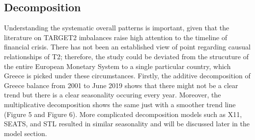 \documentclass[12pt]{article}
\begin{document}
\subsection{Decomposition}
Understanding the systematic overall patterns is important, given that the literature on TARGET2 imbalances raise high attention to the timeline of financial crisis. There has not been an established view of point regarding causual relationships of T2; therefore, the study could be deviated from the strucuture of the entire European Monetary System to a single particular country, which Greece is picked under these circumstances. Firstly, the additive decomposition of Greece balance from 2001 to June 2019 shows that there might not be a clear trend but there is a clear seasonality occuring every year. Moreover, the multiplicative decomposition shows the same just with a smoother trend line (Figure 5 and Figure 6). More complicated decomposition models such as X11, SEATS, and STL resulted in similar seasonality and will be discussed later in the model section. 
\end{document}
